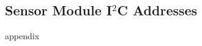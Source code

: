 \documentclass[a4paper,12pt,oneside, utf8x]{report}
\newcommand{\itwoc}{I$^2$C}
\begin{document}
 
\begin{appendices}


    \chapter{Sensor Module \itwoc{} Addresses}
        \label{appx:i2c}
        appendix
\end{appendices}
\end{document}
